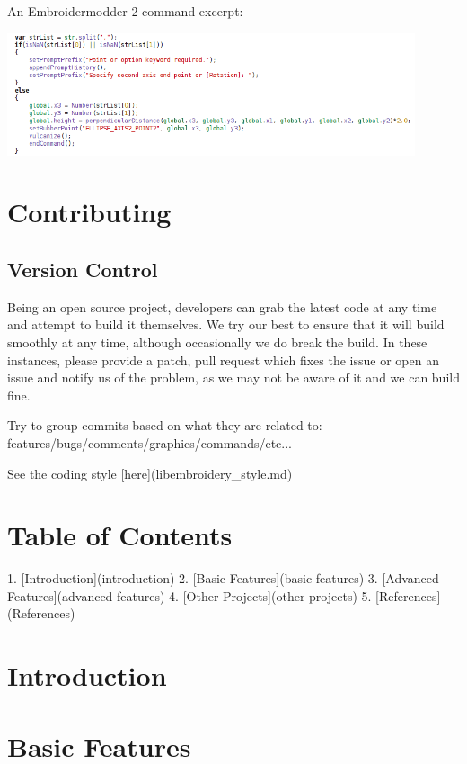 \documentclass[a4paper, 11pt]{report}
\begin{document}
An Embroidermodder 2 command excerpt:

\includegraphics[width=0.9\textwidth]{images/features-scripting-1.png}

\section{Contributing}

\subsection{Version Control}

Being an open source project, developers can grab the latest code at any time
and attempt to build it themselves. We try our best to ensure that it will build smoothly
at any time, although occasionally we do break the build. In these instances,
please provide a patch, pull request which fixes the issue or open an issue and
notify us of the problem, as we may not be aware of it and we can build fine.

Try to group commits based on what they are related to: features/bugs/comments/graphics/commands/etc...

See the coding style [here](libembroidery\_style.md)

\section{Table of Contents}

  1. [Introduction](introduction)
  2. [Basic Features](basic-features)
  3. [Advanced Features](advanced-features)
  4. [Other Projects](other-projects)
  5. [References](References)

\section{Introduction}

\section{Basic Features}
\end{document}
